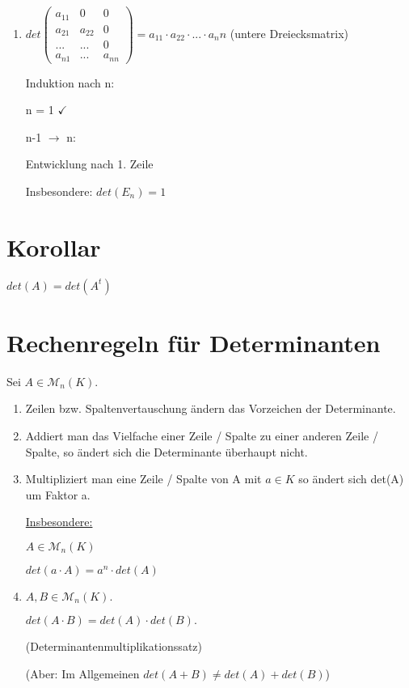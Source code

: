 \documentclass[a4paper, openany]{book}
\begin{document}
\begin{enumerate}[label=(\alph*)]
          \item $det \begin{pmatrix}a_{11} & 0 & 0 \\ a_{21} & a_{22} & 0 \\ ... & ... & 0 \\ a_{n1} & ... & a_{nn} \end{pmatrix} = a_{11} \cdot a_{22} \cdot ... \cdot a_nn$ (untere Dreiecksmatrix)

          Induktion nach n:

          n = 1 $\checkmark$

          n-1 $\rightarrow$ n:

          Entwicklung nach 1. Zeile

          \par \medskip

          \par \medskip

          Insbesondere: $det(E_n) = 1$

          \end{enumerate}

          \section{Korollar}

          $det(A) = det(A^t)$

          \section{Rechenregeln für Determinanten}

          Sei $A \in \mathcal{M}_n(K)$.

          \begin{enumerate}[label=(\alph*)]
            \item Zeilen bzw. Spaltenvertauschung ändern das Vorzeichen der Determinante.

            \item Addiert man das Vielfache einer Zeile / Spalte zu einer anderen Zeile / Spalte, so ändert sich die Determinante überhaupt nicht.

            \item Multipliziert man eine Zeile / Spalte von A mit $a \in K$ so ändert sich det(A) um Faktor a.

            \underline{Insbesondere:} 

            $A \in \mathcal{M}_n(K)$

            $det(a \cdot A) = a^n \cdot det(A)$

            \item $A, B \in \mathcal{M}_n(K).$

            $det(A \cdot B) = det(A) \cdot det(B).$

            (Determinantenmultiplikationssatz)

            (Aber: Im Allgemeinen $det(A+B) \neq det(A) + det(B)$)
          \end{enumerate}
        
\end{document}
